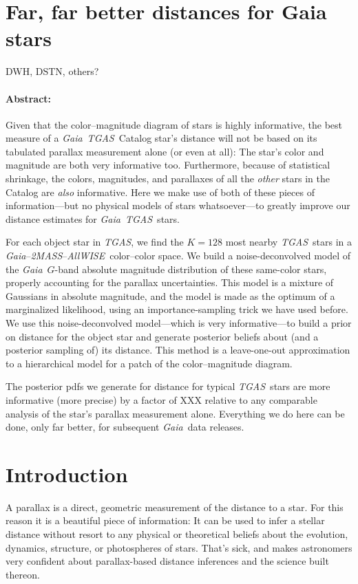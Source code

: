 \documentclass[12pt]{article}
\newcommand{\project}[1]{\textsl{#1}}
\newcommand{\acronym}[1]{\small{#1}}
\newcommand{\gaia}{\project{Gaia}}
\newcommand{\tgas}{\project{\acronym{TGAS}}}
\newcommand{\twomass}{\project{\acronym{2MASS}}}
\newcommand{\wise}{\project{All\acronym{WISE}}}
\begin{document}
\section*{Far, far better distances for Gaia stars}

\noindent
DWH, DSTN, others?

\paragraph{Abstract:}
Given that the color--magnitude diagram of stars is highly informative, the
best measure of a \gaia\ \tgas\ Catalog star's distance will not be based on
its tabulated parallax measurement alone (or even at all):
The star's color and magnitude are both very informative too.
Furthermore, because of statistical shrinkage, the colors, magnitudes,
and parallaxes of all the \emph{other} stars in the Catalog are \emph{also}
informative.
Here we make use of both of these pieces of information---but no
physical models of stars whatsoever---to greatly improve our distance
estimates for \gaia\ \tgas\ stars.

For each object star in \tgas, we find the $K=128$ most nearby \tgas\ stars
in a \gaia--\twomass--\wise\ color--color space.
We build a noise-deconvolved model of the \gaia\ $G$-band absolute
magnitude distribution of these same-color stars, properly accounting
for the parallax uncertainties.
This model is a mixture of Gaussians in absolute magnitude, and the
model is made as the optimum of a marginalized likelihood, using an
importance-sampling trick we have used before.
We use this noise-deconvolved model---which is very informative---to
build a prior on distance for the object star and generate posterior
beliefs about (and a posterior sampling of) its distance.
This method is a leave-one-out approximation to a hierarchical model for
a patch of the color--magnitude diagram.

The posterior pdfs we generate for distance for typical \tgas\ stars
are more informative (more precise) by a factor of XXX relative to any
comparable analysis of the star's parallax measurement alone.
Everything we do here can be done, only far better, for subsequent
\gaia\ data releases.

\section{Introduction}

A parallax is a direct, geometric measurement of the distance to a star.
For this reason it is a beautiful piece of information: It can be used
to infer a stellar distance without resort to any physical or
theoretical beliefs about the evolution, dynamics, structure, or
photospheres of stars.
That's sick, and makes astronomers very confident about parallax-based
distance inferences and the science built thereon.
\end{document}

